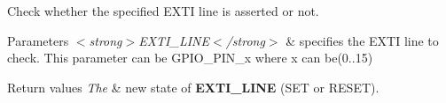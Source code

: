 Check whether the specified E\+X\+TI line is asserted or not. 


\begin{DoxyParams}{Parameters}
{\em $<$strong$>$\+E\+X\+T\+I\+\_\+\+L\+I\+N\+E$<$/strong$>$} & specifies the E\+X\+TI line to check. This parameter can be G\+P\+I\+O\+\_\+\+P\+I\+N\+\_\+x where x can be(0..15) \\
\hline
\end{DoxyParams}

\begin{DoxyRetVals}{Return values}
{\em The} & new state of {\bfseries E\+X\+T\+I\+\_\+\+L\+I\+NE} (S\+ET or R\+E\+S\+ET). \\
\hline
\end{DoxyRetVals}
